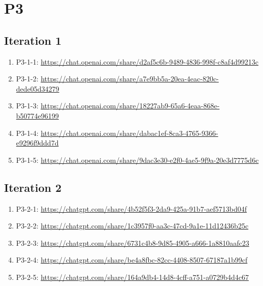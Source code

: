\section{P3\label{P3-1}}

\subsection{Iteration 1}

\begin{enumerate}
    \item P3-1-1: \href{https://chat.openai.com/share/d2af5c6b-9489-4836-998f-c8af4d99213c}{https://chat.openai.com/share/d2af5c6b-9489-4836-998f-c8af4d99213c}
    \item P3-1-2: \href{https://chat.openai.com/share/a7e9bb5a-20ea-4eac-820c-dede05d34279}{https://chat.openai.com/share/a7e9bb5a-20ea-4eac-820c-dede05d34279}
    \item P3-1-3: \href{https://chat.openai.com/share/18227ab9-65a6-4eaa-868e-b50774e96199}{https://chat.openai.com/share/18227ab9-65a6-4eaa-868e-b50774e96199}
    \item P3-1-4: \href{https://chat.openai.com/share/dabac1ef-8ca3-4765-9366-e9296f9ddd7d}{https://chat.openai.com/share/dabac1ef-8ca3-4765-9366-e9296f9ddd7d}
    \item P3-1-5: \href{https://chat.openai.com/share/9dac3e30-e2f0-4ae5-9f9a-20e3d7775d6c}{https://chat.openai.com/share/9dac3e30-e2f0-4ae5-9f9a-20e3d7775d6c}
\end{enumerate}

\subsection{Iteration 2}

\begin{enumerate}
    \item P3-2-1: \href{https://chatgpt.com/share/4b52f5f3-2da9-425a-91b7-aef5713bd04f}{https://chatgpt.com/share/4b52f5f3-2da9-425a-91b7-aef5713bd04f}
    \item P3-2-2: \href{https://chatgpt.com/share/1c3957f0-aa3c-47cd-9a1e-11d12436b25c}{https://chatgpt.com/share/1c3957f0-aa3c-47cd-9a1e-11d12436b25c}
    \item P3-2-3: \href{https://chatgpt.com/share/6731c4b8-9d85-4905-a666-1a8810aafc23}{https://chatgpt.com/share/6731c4b8-9d85-4905-a666-1a8810aafc23}
    \item P3-2-4: \href{https://chatgpt.com/share/be4a8fbc-82cc-4408-8507-67187a1b99cf}{https://chatgpt.com/share/be4a8fbc-82cc-4408-8507-67187a1b99cf}
    \item P3-2-5: \href{https://chatgpt.com/share/164a9db4-14d8-4cff-a751-a0729b4d4c67}{https://chatgpt.com/share/164a9db4-14d8-4cff-a751-a0729b4d4c67}
\end{enumerate}

